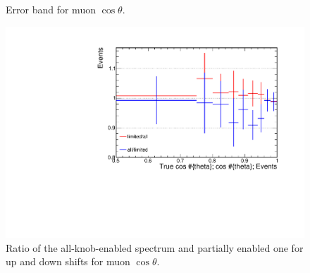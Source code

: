\documentclass[12pt,a4paper,final]{iopart}
\begin{document}
\begin{figure}[h]
  \centering
  \hfill
  \caption{Error band for muon $\cos\theta$.}
  \label{fig:error_muang}
\end{figure}
\begin{figure}[h]
  \centering
  \includegraphics[width=.9\textwidth]{figures/t_cos_ratio.pdf}
  \caption{Ratio of the all-knob-enabled spectrum and partially enabled one for up and down shifts for muon $\cos\theta$.}
  \label{fig:ratio_muang}
\end{figure}
\end{document}

